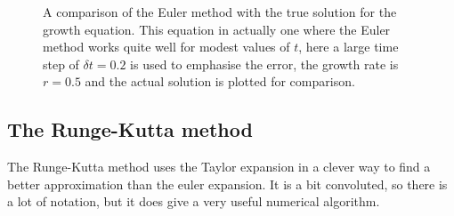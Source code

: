 \documentclass[12pt]{article}
\begin{document}
\begin{figure}
\begin{center}

\end{center}
\caption{A comparison of the Euler method with the true solution for
  the growth equation. This equation in actually one where the Euler
  method works quite well for modest values of $t$, here a large time
  step of $\delta t=0.2$ is used to emphasise the error, the growth
  rate is $r=0.5$ and the actual solution is plotted for comparison.}
\end{figure}

\subsection*{The Runge-Kutta method}

The Runge-Kutta method uses the Taylor expansion in a clever way to
find a better approximation than the euler expansion. It is a bit
convoluted, so there is a lot of notation, but it does give a very
useful numerical algorithm.
\end{document}
